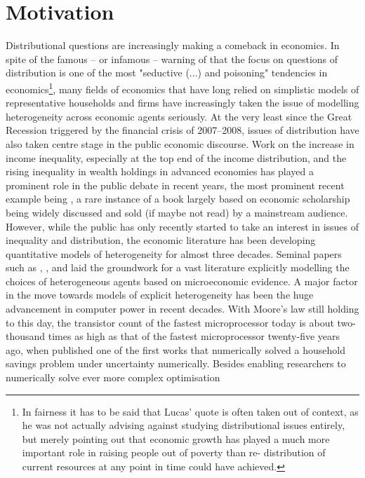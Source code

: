 \section{Motivation}
Distributional questions are increasingly making a comeback in economics. In spite
of the famous -- or infamous -- warning of \citet{Lucas2004} that the focus 
on questions of distribution is one of the most "seductive (...) and poisoning"
tendencies in economics\footnote{In fairness it has to be said that Lucas' quote
is often taken out of context, as he was not actually advising against studying 
distributional issues entirely, but merely pointing out that economic growth has
played a much more important role in raising people out of poverty than re-
distribution of current resources at any point in time could have achieved.},
many fields of economics that have long relied on simplistic models of representative
households and firms have increasingly taken the issue of modelling heterogeneity
across economic agents seriously. At the very least since the Great Recession
triggered by the financial crisis of 2007--2008, issues of distribution have also
taken centre stage in the public economic discourse. Work on the increase in 
income inequality, especially at the top end of the income distribution, and 
the rising inequality in wealth holdings in advanced economies has played a 
prominent role in the public debate in recent years, the most prominent recent
example being \citet{Piketty2014}, a rare instance of a book largely based on 
economic scholarship being widely discussed and sold (if maybe not read) by
a mainstream audience. However, while the public has only recently started to 
take an interest in issues of inequality and distribution, the economic literature
has been developing quantitative models of heterogeneity for almost three decades.
Seminal papers such as \citet{Imrohoroglu1989}, \citet{Huggett1993}, and
\citet{Aiyagari1994} laid the groundwork for a vast literature explicitly 
modelling the choices of heterogeneous agents based on microeconomic evidence.
A major factor in the move towards models of explicit heterogeneity has been 
the huge advancement in computer power in recent decades. With Moore's law
still holding to this day, the transistor count of the fastest microprocessor
today is about two-thousand times as high as that of the fastest microprocessor
twenty-five years ago, when \citet{Zeldes1989} published one of the first works
that numerically solved a household savings problem under uncertainty numerically.
Besides enabling researchers to numerically solve ever more complex optimisation
